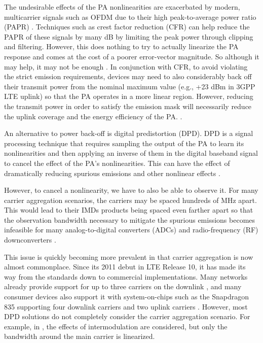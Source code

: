 {\color{red} The undesirable effects of the PA nonlinearities are exacerbated by modern, multicarrier signals such as OFDM due to their high peak-to-average power ratio (PAPR) \cite{Ghannouchi09}. Techniques such as crest factor reduction (CFR) can help reduce the PAPR of these signals by many dB by limiting the peak power through clipping and filtering. However, this does nothing to try to actually linearize the PA response and comes at the cost of a poorer error-vector magnitude. So although it may help, it may not be enough \cite{CFR}.} 
In conjunction with CFR, to avoid violating the strict emission requirements, devices may need to also considerably back off their transmit power from the nominal maximum value (e.g., +23 dBm in 3GPP LTE uplink) so that the PA operates in a more linear region. 
However, reducing the transmit power in order to satisfy the emission mask will necessarily reduce the uplink coverage and the energy efficiency of the PA. 
 \cite{P.RoblinJan.2008,J.KimJan.2013,S.A.BassamAug.2012,ICASSP2014,Commag_abdelaziz,Katz16}. 

An alternative to power back-off is digital predistortion (DPD). 
DPD is a signal processing technique that requires sampling the output of the PA to learn its nonlinearities and then applying an inverse of them in the digital baseband signal to cancel the effect of the PA's nonlinearities. 
This can have the effect of dramatically reducing spurious emissions and other nonlinear effects \cite{Katz16}.

However, to cancel a nonlinearity, we have to also be able to observe it. For many carrier aggregation scenarios, the carriers may be spaced hundreds of MHz apart. 
This would lead to their IMDs products being spaced even farther apart so that the observation bandwidth necessary to mitigate the spurious emissions becomes infeasible for many analog-to-digital converters (ADCs) and radio-frequency (RF) downconverters \cite{S.A.BassamOct.2011}. 

This issue is quickly becoming more prevalent in that carrier aggregation is now almost commonplace. Since its 2011 debut in LTE Release 10, it has made its way from the standards down to commercial implementations. Many networks already provide support for up to three carriers on the downlink \cite{AT&T}, and many consumer devices also support it with system-on-chips such as the Snapdragon 835 supporting four downlink carriers and two uplink carriers \cite{Qual835}. 
However, most DPD solutions do not completely consider the carrier aggregation scenario. 
For example, in \cite{S.A.BassamOct.2011}, the effects of intermodulation are considered, but only the bandwidth around the main carrier is linearized. 

